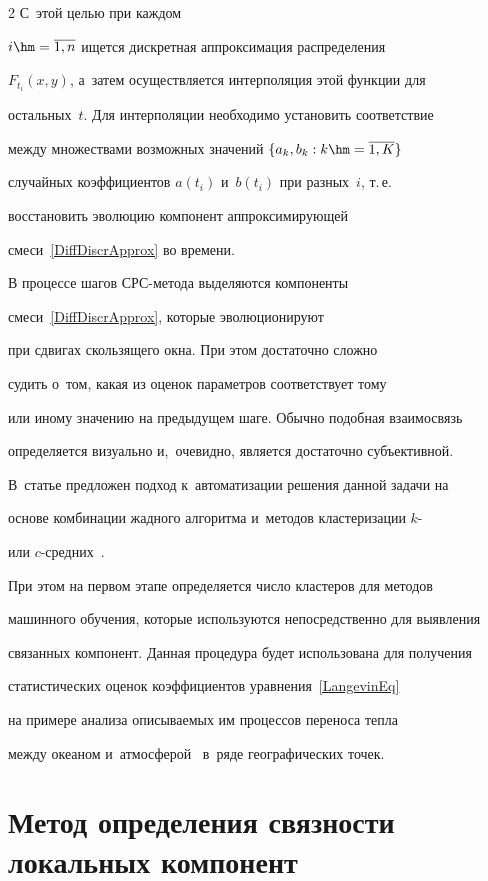 \begin{multicols}{2}
 С~этой целью при каждом 

 $i\hm=\overline{1,n}$ ищется дискретная аппроксимация распределения 

 $F_{t_i}(x,y)$, а~затем осуществляется интерполяция этой функции для 

 остальных~$t$. Для интерполяции необходимо установить соответствие 

 между множествами возможных значений $\{a_k,b_k: k\hm=\overline{1,K}\}$ 

 случайных коэффициентов $a(t_i)$ и~$b(t_i)$ при разных~$i$, т.\,е.\

  восстановить эволюцию компонент аппроксимиру\-ющей 

  смеси~\eqref{DiffDiscrApprox} во времени.



В процессе шагов СРС-метода выделяются компоненты 

смеси~\eqref{DiffDiscrApprox}, которые эволюционируют 

при сдвигах скользящего окна. При этом достаточно слож\-но 

судить о~том, какая из оценок па\-ра\-мет\-ров соответствует тому 

или иному значению на предыдущем шаге. Обычно по\-доб\-ная взаимосвязь 

определяется визуально и,~очевидно, является достаточно субъективной.

 В~статье предложен подход к~автоматизации решения данной задачи на 

 основе комбинации жад\-но\-го алгоритма и~методов клас\-те\-ри\-за\-ции $k$- 

 или $c$-сред\-них~\cite{Steinhaus1956,MacQueen1967,David2007,Dunn1973}. 

 При этом на первом этапе определяется чис\-ло клас\-те\-ров для методов 

 машинного обучения, которые используются непосредственно для вы\-яв\-ле\-ния 

 связанных компонент. Данная процедура будет использована для получения 

 статистических оценок коэффициентов урав\-не\-ния~\eqref{LangevinEq} 

 на примере анализа опи\-сы\-ва\-емых им процессов переноса теп\-ла 

 между океаном и~атмосферой~\cite{Belyaev2018} в~ряде географических точек.



\section{Метод определения связности локальных компонент}


\end{multicols}
